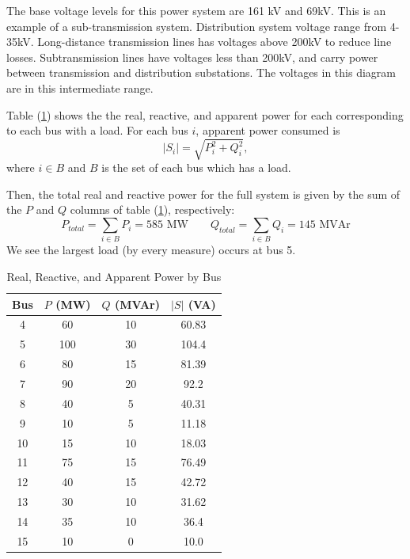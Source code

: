 \documentclass{homework}
\begin{document}
\begin{letterenum}
    \item The base voltage levels for this power system are 161 kV and 69kV.
    This is an example of a sub-transmission system. Distribution system 
    voltage range from 4-35kV. Long-distance transmission lines has
    voltages above 200kV to reduce line losses. Subtransmission lines
    have voltages less than 200kV, and carry power between transmission
    and distribution substations. The voltages in this diagram are
    in this intermediate range.

    \item Table (\ref{table:power-by-bus}) shows the the real, reactive, and apparent power for each
    corresponding to each bus with a load. For each bus $i$, apparent power
    consumed is
    \begin{equation}
        |S_i| = \sqrt{P_i^2 + Q_i^2},
    \end{equation}
    where $i\in B$ and $B$ is the set of each bus which has a load.

    Then, the total real and reactive power for the full system is given by
    the sum of the $P$ and $Q$ columns of table (\ref{table:power-by-bus}),
    respectively:
    \begin{equation}
        P_{total} = \sum_{i \in B} P_i = 585 \text{ MW} \qquad
        Q_{total} = \sum_{i \in B} Q_i = 145 \text{ MVAr}
    \end{equation}
    We see the largest load (by every measure) occurs at bus 5.

    \begin{table}[h!]
    \centering
    \begin{tabular}{|c|c|c|c|}
        \hline
        Bus & $P$ (MW) & $Q$ (MVAr) & $|S|$ (VA) \\
        \hline
        4 & 60 & 10  & 60.83  \\
        5 & 100 & 30 & 104.4  \\
        6 & 80 & 15  & 81.39  \\
        7 & 90 & 20  & 92.2   \\
        8 & 40 & 5   & 40.31  \\
        9 & 10 & 5   & 11.18  \\
        10 & 15 & 10 & 18.03  \\
        11 & 75 & 15 & 76.49  \\
        12 & 40 & 15 & 42.72  \\
        13 & 30 & 10 & 31.62  \\
        14 & 35 & 10 & 36.4   \\
        15 & 10 & 0  & 10.0   \\
        \hline
    \end{tabular}
    \caption{Real, Reactive, and Apparent Power by Bus}
    \label{table:power-by-bus}
    \end{table}
    
















    
\end{letterenum}
\end{document}
